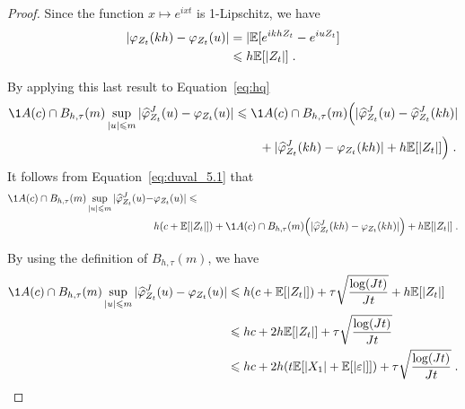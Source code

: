 \begin{proof}
Since the function $x \mapsto e^{ixt}$ is 1-Lipschitz, we have
    \begin{subequations}
    \begin{align*}
        | \varphi_{Z_{t}}(kh) -  \varphi_{Z_{t}}(u) |
         &= |\mathbb{E}[e^{i kh Z_t} - e^{i u Z_t} ] \\
         &\leqslant h\mathbb{E}[|Z_t|]
         \; .
    \end{align*}
    \end{subequations}

By applying this last result to Equation~\eqref{eq:hq}
\begin{equation*}
    \begin{split}
        \1{A(c) \cap B_{h, \tau}(m)} \sup_{|u| \leq m}| \hat \varphi^J_{Z_{t}}(u) - \fctcar{Z_{t}}(u)| 
        &\leq \1{A(c) \cap B_{h, \tau}(m)} \Big( | \hat \varphi^J_{Z_{t}}(u) -  \hat \varphi^J_{Z_{t}}(kh) |  \\
        &\qquad +  | \hat \varphi^J_{Z_{t}}(kh) -  \varphi_{Z_{t}}(kh) | + h\E[|Z_t|] \Big)
        \eqfinp
    \end{split} 
\end{equation*}
It follows from Equation~\eqref{eq:duval_5.1} that
\begin{equation*}
    \begin{split}
        \1{A(c) \cap B_{h, \tau}(m)} \sup_{|u| \leq m}| \hat \varphi^J_{Z_{t}}(u) - &\fctcar{Z_{t}}(u)|
        \leq \\
        & h(c + \E[|Z_t|]) + \1{A(c) \cap B_{h, \tau}(m)}\Big( | \hat \varphi^J_{Z_{t}}(kh) -  \varphi_{Z_{t}}(kh) | \Big) + h\E[|Z_t|]
        \eqfinp    
    \end{split}
\end{equation*}

By using the definition of  $B_{h, \tau}(m)$, we have 
\begin{align}
        \1{A(c) \cap B_{h, \tau}(m)} \sup_{|u| \leq m}| \hat \varphi^J_{Z_{t}}(u) - \fctcar{Z_{t}}(u)| 
        &\leq h(c + \E[|Z_t|]) + \tau \sqrt{\frac{\log(Jt)}{Jt}} + h\E[|Z_t|] \notag{}\\
        &\leq hc + 2h\E[|Z_t|] + \tau \sqrt{\frac{\log(Jt)}{Jt}} \notag{}\\
        &\leq hc + 2h(t\E[|X_1| + \E[|\varepsilon|]]) + \tau \sqrt{\frac{\log(Jt)}{Jt}}        
    \eqfinp    
    \label{eq:duval_5.4}
\end{align}


\end{proof}
